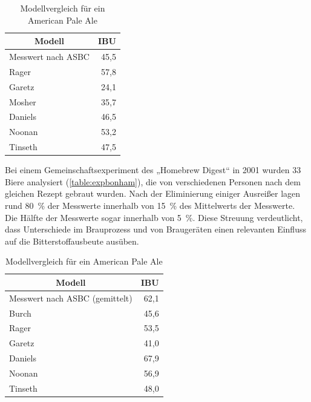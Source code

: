 \documentclass[a4paper,parskip=half]{scrartcl}
\begin{document}
\begin{table}[h]
\centering
\begin{tabular}{lr}
\toprule
\multicolumn{1}{c}{\textbf{Modell}} & \multicolumn{1}{c}{\textbf{IBU}} \\
\midrule
Messwert nach ASBC & 45,5 \\
Rager             & 57,8 \\
Garetz            & 24,1 \\
Mosher            & 35,7 \\
Daniels           & 46,5 \\
Noonan            & 53,2 \\
Tinseth           & 47,5 \\
\bottomrule
\end{tabular}
\caption{Modellvergleich für ein American Pale Ale \parencite{Hall1997}}
\label{table:exphall}
\end{table}

Bei einem Gemeinschaftsexperiment des „Homebrew Digest“ in 2001 wurden 33 Biere analysiert (\autoref{table:expbonham}), die von verschiedenen Personen nach dem gleichen Rezept gebraut wurden. Nach der Eliminierung einiger Ausreißer lagen rund 80~\% der Messwerte innerhalb von 15~\% des Mittelwerts der Messwerte. Die Hälfte der Messwerte sogar innerhalb von 5~\%. Diese Streuung verdeutlicht, dass Unterschiede im Brauprozess und von Braugeräten einen relevanten Einfluss auf die Bitterstoffausbeute ausüben. \parencite{Bonham2001}

\begin{table}[h]
\centering
\begin{tabular}{lr}
\toprule
\multicolumn{1}{c}{\textbf{Modell}} & \multicolumn{1}{c}{\textbf{IBU}} \\
\midrule
Messwert nach ASBC (gemittelt) & 62,1 \\
Burch             & 45,6 \\
Rager             & 53,5 \\
Garetz            & 41,0 \\
Daniels           & 67,9 \\
Noonan            & 56,9 \\
Tinseth           & 48,0 \\
\bottomrule
\end{tabular}
\caption{Modellvergleich für ein American Pale Ale \parencite{Bonham2001}}
\label{table:expbonham}
\end{table}
\end{document}
